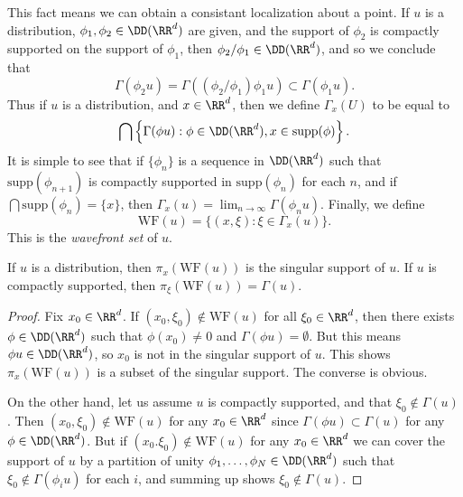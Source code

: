 This fact means we can obtain a consistant localization about a point. If $u$ is a distribution, $\phi_1,\phi_2 \in \DD(\RR^d)$ are given, and the support of $\phi_2$ is compactly supported on the support of $\phi_1$, then $\phi_2/\phi_1 \in \DD(\RR^d)$, and so we conclude that
%
\[ \Gamma(\phi_2 u) = \Gamma((\phi_2/\phi_1) \phi_1 u) \subset \Gamma(\phi_1 u). \]
%
Thus if $u$ is a distribution, and $x \in \RR^d$, then we define $\Gamma_x(U)$ to be equal to
%
\[ \bigcap \left\{ \Gamma(\phi u) : \phi \in \DD(\RR^d), x \in \text{supp}(\phi) \right\}. \]
%
It is simple to see that if $\{ \phi_n \}$ is a sequence in $\DD(\RR^d)$ such that $\text{supp}(\phi_{n+1})$ is compactly supported in $\text{supp}(\phi_n)$ for each $n$, and if $\bigcap \text{supp}(\phi_n) = \{ x \}$, then $\Gamma_x(u) = \lim_{n \to \infty} \Gamma(\phi_n u)$. Finally, we define
%
\[ \text{WF}(u) = \{ (x,\xi): \xi \in \Gamma_x(u) \}. \]
%
This is the \emph{wavefront set} of $u$.

\begin{lemma}
    If $u$ is a distribution, then $\pi_x(\text{WF}(u))$ is the singular support of $u$. If $u$ is compactly supported, then $\pi_\xi(\text{WF}(u)) = \Gamma(u)$.
\end{lemma}
\begin{proof}
    Fix $x_0 \in \RR^d$. If $(x_0,\xi_0) \not \in \text{WF}(u)$ for all $\xi_0 \in \RR^d$, then there exists $\phi \in \DD(\RR^d)$ such that $\phi(x_0) \neq 0$ and $\Gamma(\phi u) = \emptyset$. But this means $\phi u \in \DD(\RR^d)$, so $x_0$ is not in the singular support of $u$. This shows $\pi_x(\text{WF}(u))$ is a subset of the singular support. The converse is obvious.

    On the other hand, let us assume $u$ is compactly supported, and that $\xi_0 \not \in \Gamma(u)$. Then $(x_0,\xi_0) \not \in \text{WF}(u)$ for any $x_0 \in \RR^d$ since $\Gamma(\phi u) \subset \Gamma(u)$ for any $\phi \in \DD(\RR^d)$. But if $(x_0.\xi_0) \not \in \text{WF}(u)$ for any $x_0 \in \RR^d$ we can cover the support of $u$ by a partition of unity $\phi_1,\dots,\phi_N \in \DD(\RR^d)$ such that $\xi_0 \not \in \Gamma(\phi_i u)$ for each $i$, and summing up shows $\xi_0 \not \in \Gamma(u)$.
\end{proof}

